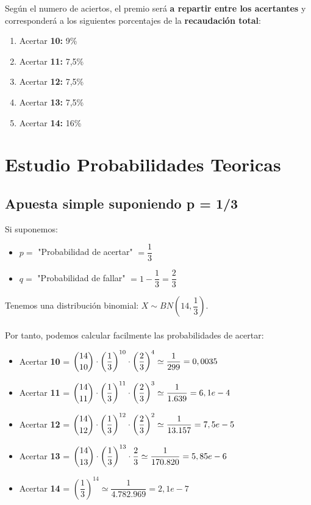 \documentclass{article}
\begin{document}
Según el numero de aciertos, el premio será \textbf{a repartir entre los acertantes} y corresponderá a los siguientes porcentajes de la \textbf{recaudación total}:

\begin{enumerate}
    \item Acertar \textbf{10:} 9\%
    \item Acertar \textbf{11:} 7,5\%
    \item Acertar \textbf{12:} 7,5\%
    \item Acertar \textbf{13:} 7,5\%
    \item Acertar \textbf{14:} 16\%
\end{enumerate}

\section{Estudio Probabilidades Teoricas}

\subsection{Apuesta simple suponiendo p = 1/3}

Si suponemos:
\begin{itemize}
    \item $p =$ "Probabilidad de acertar" $= \dfrac{1}{3}$
    \item $q =$ "Probabilidad de fallar" $= 1 - \dfrac{1}{3} = \dfrac{2}{3}$
\end{itemize}

Tenemos una distribución binomial: $X \sim BN(14,\dfrac{1}{3})$.
\\\\
Por tanto, podemos calcular facilmente las probabilidades de acertar:

\begin{itemize}
    \item Acertar \textbf{10} = $\dbinom{14}{10} \cdot \left(\dfrac{1}{3}\right)^{10} \cdot \left(\dfrac{2}{3}\right)^{4} \simeq \dfrac{1}{299} = 0,0035$ 
    \item Acertar \textbf{11} = $\dbinom{14}{11} \cdot \left(\dfrac{1}{3}\right)^{11} \cdot \left(\dfrac{2}{3}\right)^{3} \simeq \dfrac{1}{1.639} = 6,1e-4$ 
    \item Acertar \textbf{12} = $\dbinom{14}{12} \cdot \left(\dfrac{1}{3}\right)^{12} \cdot \left(\dfrac{2}{3}\right)^2 \simeq \dfrac{1}{13.157} = 7,5e-5 $  
    \item Acertar \textbf{13} = $\dbinom{14}{13} \cdot \left(\dfrac{1}{3}\right)^{13} \cdot \dfrac{2}{3} \simeq \dfrac{1}{170.820} = 5,85e-6 $ 
    \item Acertar \textbf{14} = $\left(\dfrac{1}{3}\right)^{14} \simeq \dfrac{1}{4.782.969} = 2,1e-7 $
\end{itemize}
\end{document}
